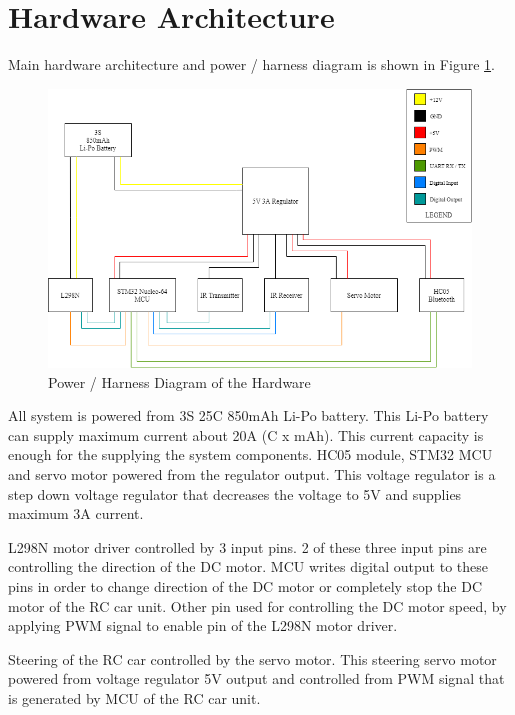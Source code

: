\section{Hardware Architecture} \label{sec_hardware_design}

Main hardware architecture and power / harness diagram is shown in Figure \ref{fig:hardware_architecture}. 

\begin{figure}[!htbp]
    \centering
    \includegraphics[width=1\textwidth]{Imgs/ana_devre_v3.png}
    \caption{\label{fig:hardware_architecture}Power / Harness Diagram of the Hardware}
\end{figure}

All system is powered from 3S 25C 850mAh Li-Po battery. This Li-Po battery can supply maximum current about 20A (C x mAh). This current capacity is enough for the supplying the system components. HC05 module, STM32 MCU and servo motor powered from the regulator output. This voltage regulator is a step down voltage regulator that decreases the voltage to 5V and supplies maximum 3A current.

L298N motor driver controlled by 3 input pins. 2 of these three input pins are controlling the direction of the DC motor. MCU writes digital output to these pins in order to change direction of the DC motor or completely stop the DC motor of the RC car unit. Other pin used for controlling the DC motor speed, by applying PWM signal to enable pin of the L298N motor driver. 

Steering of the RC car controlled by the servo motor. This steering servo motor powered from voltage regulator 5V output and controlled from PWM signal that is generated by MCU of the RC car unit. 

